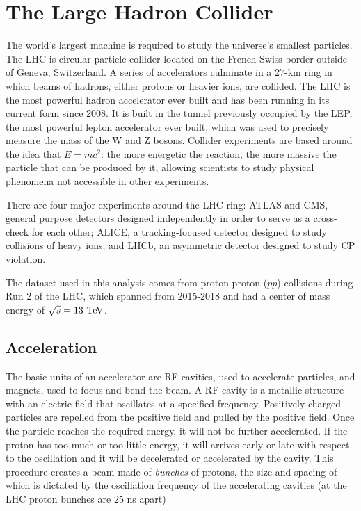 \chapter{The Large Hadron Collider}
\label{chap:LHC}

The world's largest machine is required to study the universe's smallest particles. The \ac{LHC} is circular particle collider located on the French-Swiss border outside of Geneva, Switzerland. A series of accelerators culminate in a $27$-km ring in which beams of hadrons, either protons or heavier ions, are collided. The \ac{LHC} is the most powerful hadron accelerator ever built and has been running in its current form since 2008. It is built in the tunnel previously occupied by the \ac{LEP}, the most powerful lepton accelerator ever built, which was used to precisely measure the mass of the W and Z bosons. Collider experiments are based around the idea that $E=mc^2$: the more energetic the reaction, the more massive the particle that can be produced by it, allowing scientists to study physical phenomena not accessible in other experiments. 

There are four major experiments around the \ac{LHC} ring: \ac{ATLAS} and \ac{CMS}, general purpose detectors designed independently in order to serve as a cross-check for each other; \ac{ALICE}, a tracking-focused detector designed to study collisions of heavy ions; and \ac{LHCb}, an asymmetric detector designed to study \ac{CP} violation. 

The dataset used in this analysis comes from proton-proton ($pp$) collisions during Run 2 of the \ac{LHC}, which spanned from 2015-2018 and had a center of mass energy of $\sqrt{s} = 13 \TeV$.


\section{Acceleration}
The basic units of an accelerator are \ac{RF} cavities, used to accelerate particles, and magnets, used to focus and bend the beam. A \ac{RF} cavity is a metallic structure with an electric field that oscillates at a specified frequency. Positively charged particles are repelled from the positive field and pulled by the positive field. Once the particle reaches the required energy, it will not be further accelerated. If the proton has too much or too little energy, it will arrives early or late with respect to the oscillation and it will be decelerated or accelerated by the cavity. This procedure creates a beam made of \emph{bunches} of protons, the size and spacing of which is dictated by the oscillation frequency of the accelerating cavities (at the \ac{LHC} proton bunches are $25$ ns apart) \cite{cern-cavities}

